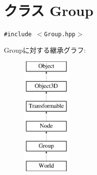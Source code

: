 \hypertarget{classm3g_1_1Group}{
\section{クラス Group}
\label{classm3g_1_1Group}
}
{\tt \#include $<$Group.hpp$>$}

Groupに対する継承グラフ:\begin{figure}[H]
\begin{center}
\leavevmode
\includegraphics[height=6cm]{classm3g_1_1Group}
\end{center}
\end{figure}
